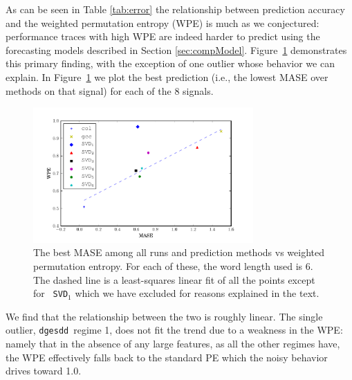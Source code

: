 \documentclass{article}
\newcommand{\svd}{{\tt dgesdd}~}
\begin{document}
As can be seen in Table \ref{tab:error} the relationship between prediction
accuracy and the weighted permutation entropy (WPE) is much as we conjectured:
performance traces with high WPE are indeed harder to predict using the
forecasting models described in Section \ref{sec:compModel}.
Figure~\ref{fig:pred_vs_wpe} demonstrates this primary finding, with the
exception of one outlier whose behavior we can explain. In
Figure~\ref{fig:pred_vs_wpe} we plot the best prediction (i.e., the lowest MASE
over methods on that signal) for each of the 8 signals.
\begin{figure}[htbp]
  \centering
  \includegraphics[width=0.75\textwidth]{figs/prediction_vs_entropy}
  \caption{The best MASE among all runs and prediction methods vs weighted
  permutation entropy. For each of these, the word length used is $6$. The
  dashed line is a least-squares linear fit of all the points except for {\tt
  SVD$_1$} which we have excluded for reasons explained in the text.}
  \label{fig:pred_vs_wpe}
\end{figure}
We find that the relationship between the two is roughly linear. The single
outlier, \svd regime 1, does not fit the trend due to a weakness in the WPE:
namely that in the absence of any large features, as all the other regimes have,
the WPE effectively falls back to the standard PE which the noisy behavior
drives toward 1.0.
\end{document}
